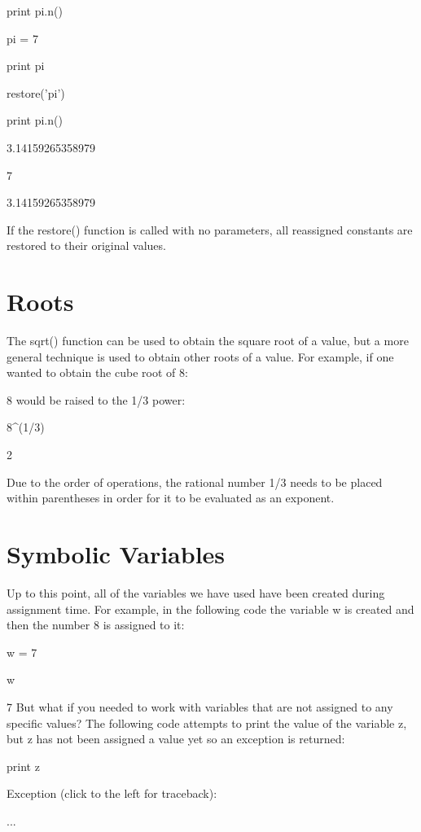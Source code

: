 \documentclass[12pt,oneside]{book}
\begin{document}
print pi.n()


pi = 7

print pi


restore('pi')

print pi.n()

{\textbar}

3.14159265358979

7

3.14159265358979

If the restore() function is called with no parameters, all reassigned constants are restored to their original values.

\section[Roots]{Roots}

The sqrt() function can be used to obtain the square root of a value, but a more general technique is used to obtain other roots of a value. For example, if one wanted to obtain the cube root of 8: 

8 would be raised to the 1/3 power:

8\^{}(1/3)

{\textbar}

2


Due to the order of operations, the rational number 1/3 needs to be placed within parentheses in order for it to be evaluated as an exponent.

\section[Symbolic Variables]{Symbolic Variables}

Up to this point, all of the variables we have used have been created during assignment time. For example, in the following code the variable w is created and then the number 8 is assigned to it: 

w = 7

w

{\textbar}

7
But what if you needed to work with variables that are not assigned to any specific values? The following code attempts to print the value of the variable z, but z has not been assigned a value yet so an exception is returned: 

print z

{\textbar}

Exception (click to the left for traceback):

...
\end{document}
